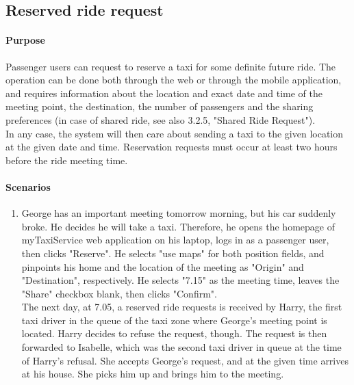\subsection{Reserved ride request}
	\paragraph{Purpose}
		Passenger users can request to reserve a taxi for some definite future ride. The operation can be done both through the web or through the mobile application, and requires information about the location and exact date and time of the meeting point, the destination, the number of passengers and the sharing preferences (in case of shared ride, see also 3.2.5, "Shared Ride Request").\\
		In any case, the system will then care about sending a taxi to the given location at the given date and time. Reservation requests must occur at least two hours before the ride meeting time.
	
	\paragraph{Scenarios}
		\begin{enumerate}
			\item George has an important meeting tomorrow morning, but his car suddenly broke. He decides he will take a taxi. Therefore, he opens the homepage of myTaxiService web application on his laptop, logs in as a passenger user, then clicks "Reserve". He selects "use maps" for both position fields, and pinpoints his home and the location of the meeting as "Origin" and "Destination", respectively. He selects "7.15" as the meeting time, leaves the "Share" checkbox blank, then clicks "Confirm".\\
			The next day, at 7.05, a reserved ride requests is received by Harry, the first taxi driver in the queue of the taxi zone where George's meeting point is located. Harry decides to refuse the request, though. The request is then forwarded to Isabelle, which was the second taxi driver in queue at the time of Harry's refusal. She accepts George's request, and at the given time arrives at his house. She picks him up and brings him to the meeting.
		\end{enumerate}
	

